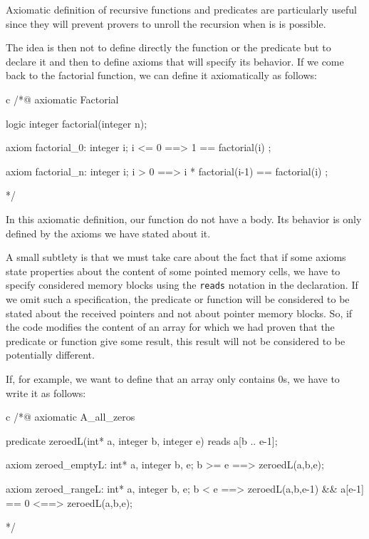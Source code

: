 \documentclass[middle]{zmdocument}
\begin{document}
Axiomatic definition of recursive functions and predicates are
particularly useful since they will prevent provers to unroll the
recursion when is is possible.



The idea is then not to define directly the function or the predicate
but to declare it and then to define axioms that will specify its
behavior. If we come back to the factorial function, we can define it
axiomatically as follows:



\begin{CodeBlock}{c}
/*@
  axiomatic Factorial{
    logic integer factorial(integer n);
    
    axiom factorial_0:
      \forall integer i; i <= 0 ==> 1 == factorial(i) ;

    axiom factorial_n:
      \forall integer i; i > 0 ==> i * factorial(i-1) == factorial(i) ;
  }
*/
\end{CodeBlock}



In this axiomatic definition, our function do not have a body. Its
behavior is only defined by the axioms we have stated about it.



A small subtlety is that we must take care about the fact that if some
axioms state properties about the content of some pointed memory cells,
we have to specify considered memory blocks using the \texttt{reads}
notation in the declaration. If we omit such a specification, the
predicate or function will be considered to be stated about the received
pointers and not about pointer memory blocks. So, if the code modifies
the content of an array for which we had proven that the predicate or
function give some result, this result will not be considered to be
potentially different.




If, for example, we want to define that an array only contains 0s, we
have to write it as follows:



\begin{CodeBlock}{c}
/*@
  axiomatic A_all_zeros{
    predicate zeroed{L}(int* a, integer b, integer e) reads a[b .. e-1];

    axiom zeroed_empty{L}:
      \forall int* a, integer b, e; b >= e ==> zeroed{L}(a,b,e);
      
    axiom zeroed_range{L}:
      \forall int* a, integer b, e; b < e ==>
        zeroed{L}(a,b,e-1) && a[e-1] == 0 <==> zeroed{L}(a,b,e);
  }
*/
\end{CodeBlock}
\end{document}
